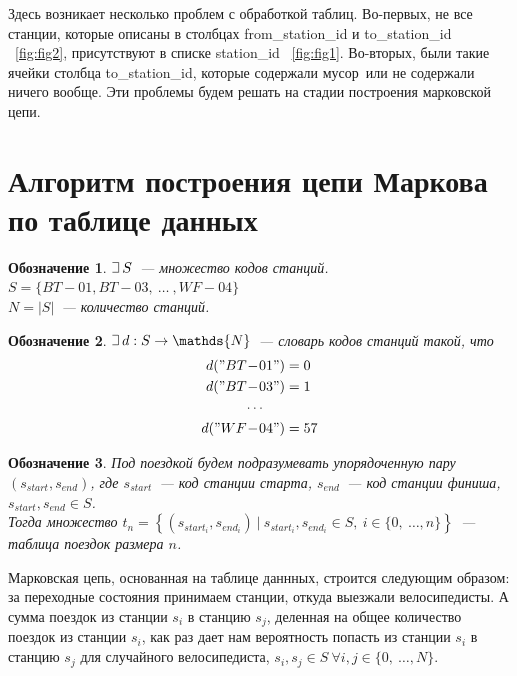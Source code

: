 \documentclass[specialist, substylefile = spbu_report.rtx, subf,href,colorlinks=true, 12pt]{disser}
\newtheorem{designation}{Обозначение}
\newcommand{\ds}{\displaystyle}
\def\letus{%
	\mathord{\setbox0=\hbox{$\exists$}%
		\hbox{\kern 0.125\wd0%
			\vbox to \ht0{%
				\hrule width 0.75\wd0%
				\vfill%
				\hrule width 0.75\wd0}%
			\vrule height \ht0%
			\kern 0.125\wd0}%
	}%
}
\begin{document}
Здесь возникает несколько проблем с обработкой таблиц. Во-первых, не все станции, которые описаны в столбцах from\_station\_id и to\_station\_id ~\eqref{fig:fig2}, присутствуют в списке station\_id ~\eqref{fig:fig1}. Во-вторых, были такие ячейки столбца to\_station\_id, которые содержали \guillemotleft мусор\guillemotright  \ или не содержали ничего вообще. Эти проблемы будем решать на стадии построения марковской цепи.

\newpage
\section{Алгоритм построения цепи Маркова по таблице данных}

\begin{designation}
	$\letus \, S$~--- множество кодов станций.\\
	$S = \{BT\!-\!01, BT\!-\!03, \ \ldots \ , WF\!-\!04\}$ \\ 
	$N = |S|$~--- количество станций.
\end{designation}

\begin{designation}\label{design:design_dict}
	$\ds{\letus \, d: S \rightarrow \mathds{N}}$~--- словарь кодов станций такой, что
	\begin{align*}
	d("BT\!&-\!01") = 0 \\
	d("BT\!&-\!03") = 1 \\
	&\cdots \\
	d("WF\!&-\!04") = 57 
	\end{align*}
\end{designation}

\begin{designation}
	Под поездкой будем подразумевать упорядоченную пару $(s_{start}, s_{end})$, где $s_{start}$~--- код станции старта, $s_{end}$~--- код станции финиша, $s_{start}, s_{end} \in S$. \\
	Тогда множество $t_n = \left\{ (s_{start_i}, s_{end_i}) \ | \ s_{start_i}, s_{end_i} \in S, \ i \in \{0, \ \ldots, n\} \right\}$~--- таблица поездок размера $n$.
\end{designation}

Марковская цепь, основанная на таблице даннных, строится следующим образом: за переходные состояния принимаем станции, откуда выезжали велосипедисты. А сумма поездок из станции $s_i$ в станцию $s_j$, деленная на общее количество поездок из станции $s_i$, как раз дает нам вероятность попасть из станции $s_i$ в станцию $s_j$ для случайного велосипедиста, $s_i, s_j \in S \ \forall i, j \in \{0, \ \ldots, N\}$.
\end{document}
